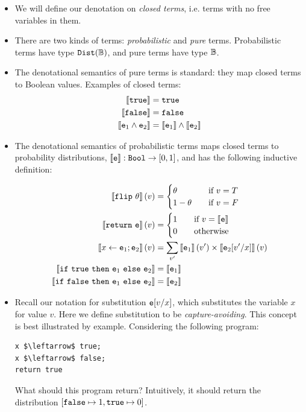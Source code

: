 \documentclass{tufte-handout}
\begin{document}
\begin{itemize}
\item We will define our denotation on \emph{closed terms}, i.e. terms with 
  no free variables in them. 
\item There are two kinds of terms: \emph{probabilistic} and \emph{pure} terms. 
Probabilistic terms have type $\mathtt{Dist}(\mathbb{B})$, and pure terms have type $\mathbb{B}$.
\item The denotational semantics of pure terms is standard: they map closed
  terms to Boolean values. Examples of closed terms:
  \begin{align*}
    \left \llbracket {\texttt{true}} \right \rrbracket &= \texttt{true} \\ 
    \left \llbracket {\texttt{false}} \right \rrbracket &= \texttt{false} \\ 
    \left \llbracket {\texttt{e}_1 \land \texttt{e}_2} \right \rrbracket &= \left \llbracket {\texttt{e}_1} \right \rrbracket \land \left \llbracket {\texttt{e}_2} \right \rrbracket
  \end{align*}
\item The denotational semantics of probabilistic terms maps closed terms 
to probability distributions, $\left \llbracket {\texttt{e}} \right \rrbracket : \texttt{Bool} \rightarrow [0, 1]$,
and has the following inductive definition:

\begin{align*}
\left \llbracket {\texttt{flip}~\theta} \right \rrbracket(v) &= 
\begin{cases}
\theta& \quad \text{if }v = T\\
1-\theta& \quad \text{if }v = F\\
\end{cases}
 \\
 \left \llbracket {\texttt{return}~\texttt{e}} \right \rrbracket(v) &= 
 \begin{cases}
 1\quad& \text{if }v = \left \llbracket {\texttt{e}} \right \rrbracket\\
 0\quad&  \text{otherwise}\\
 \end{cases}
 \\
\left \llbracket {x \leftarrow \texttt{e}_1; \texttt{e}_2} \right \rrbracket(v) &= \sum_{v'} \left \llbracket {\texttt{e}_1} \right \rrbracket(v') \times \left \llbracket {\texttt{e}_2[v'/x]} \right \rrbracket(v)
\\
\left \llbracket {\texttt{if}~\texttt{true}~\texttt{then}~\texttt{e}_1~\texttt{else}~\texttt{e}_2} \right \rrbracket &= \left \llbracket {\texttt{e}_1} \right \rrbracket \\
\left \llbracket {\texttt{if}~\texttt{false}~\texttt{then}~\texttt{e}_1~\texttt{else}~\texttt{e}_2} \right \rrbracket &= \left \llbracket {\texttt{e}_2} \right \rrbracket
\end{align*}

\item Recall our notation for substitution $\texttt{e}[v/x]$, which substitutes the 
  variable $x$ for value $v$. Here we define substitution to 
  be \emph{capture-avoiding}. This concept is best illustrated by example. 
  Considering the following program:
\begin{lstlisting}[mathescape=true]
x $\leftarrow$ true;
x $\leftarrow$ false;
return true
\end{lstlisting}
  What should this program return? Intuitively, it should return the 
  distribution $[\texttt{false} \mapsto 1, \texttt{true} \mapsto 0]$. 


\end{itemize}
\end{document}
